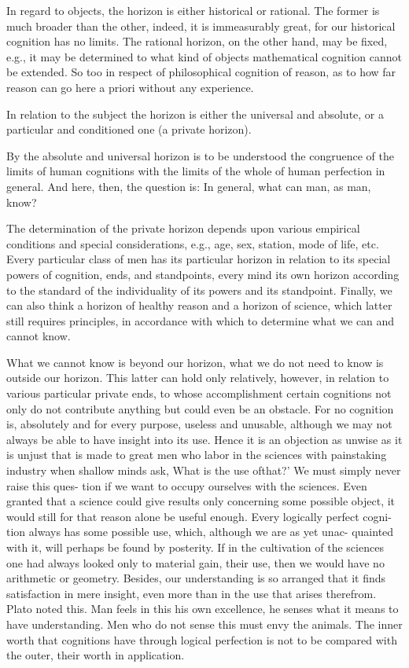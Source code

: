 In regard to objects, the horizon is either historical or rational.
The former is much broader than the other,
indeed, it is immeasurably great,
for our historical cognition has no limits.
The rational horizon, on the other hand, may be fixed,
e.g., it may be determined to what kind of objects
mathematical cognition cannot be extended.
So too in respect of philosophical cognition of reason,
as to how far reason can go here a priori without any experience.

In relation to the subject the horizon is
either the universal and absolute,
or a particular and conditioned one (a private horizon).

By the absolute and universal horizon is to be understood
the congruence of the limits of human cognitions with
the limits of the whole of human perfection in general.
And here, then, the question is:
In general, what can man, as man, know?

The determination of the private horizon depends upon
various empirical conditions and special considerations,
e.g., age, sex, station, mode of life, etc.
Every particular class of men has its particular horizon
in relation to its special powers of cognition, ends, and standpoints,
every mind its own horizon according to the standard of
the individuality of its powers and its standpoint.
Finally, we can also think a horizon of healthy reason
and a horizon of science,
which latter still requires principles,
in accordance with which to determine
what we can and cannot know.

What we cannot know is beyond our horizon,
what we do not need to know is outside our horizon.
 This latter can hold only relatively, however,
in relation to various particular private ends, to whose accomplishment
certain cognitions not only do not contribute anything but could even be
an obstacle. For no cognition is, absolutely and for every purpose, useless
and unusable, although we may not always be able to have insight into its
use. Hence it is an objection as unwise as it is unjust that is made to great
men who labor in the sciences with painstaking industry when shallow
minds ask, What is the use ofthat?' We must simply never raise this ques-
tion if we want to occupy ourselves with the sciences. Even granted that a
science could give results only concerning some possible object, it would
still for that reason alone be useful enough. Every logically perfect cogni-
tion always has some possible use, which, although we are as yet unac-
quainted with it, will perhaps be found by posterity. If in the cultivation of
the sciences one had always looked only to material gain, their use, then
we would have no arithmetic or geometry. Besides, our understanding is
so arranged that it finds satisfaction in mere insight, even more than in the
use that arises therefrom. Plato noted this. Man feels in this his own
excellence, he senses what it means to have understanding. Men who do
not sense this must envy the animals. The inner worth that cognitions have
through logical perfection is not to be compared with the outer, their worth
in application.

